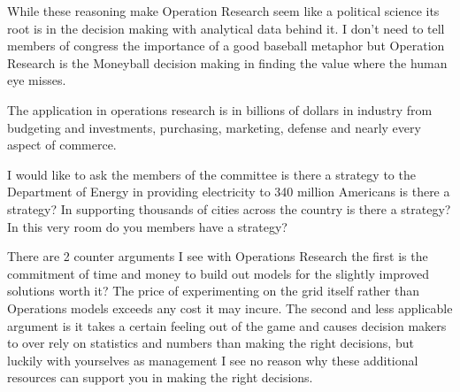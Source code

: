 \documentclass{article}
\begin{document}
While these reasoning make Operation Research seem like a political science its root is in the decision making with analytical data behind it. I don't need to tell members of congress the importance of a good baseball metaphor but Operation Research is the Moneyball decision making in finding the value where the human eye misses.

The application in operations research is in billions of dollars in industry from budgeting and investments, purchasing, marketing, defense and nearly every aspect of commerce.

I would like to ask the members of the committee is there a strategy to the Department of Energy in providing electricity to 340 million Americans is there a strategy? In supporting thousands of cities across the country is there a strategy? In this very room do you members have a strategy?

There are 2 counter arguments I see with Operations Research the first is the commitment of time and money to build out models for the slightly improved solutions worth it? The price of experimenting on the grid itself rather than Operations models exceeds any cost it may incure. The second and less applicable argument is it takes a certain feeling out of the game and causes decision makers to over rely on statistics and numbers than making the right decisions, but luckily with yourselves as management I see no reason why these additional resources can support you in making the right decisions.
\end{document}

